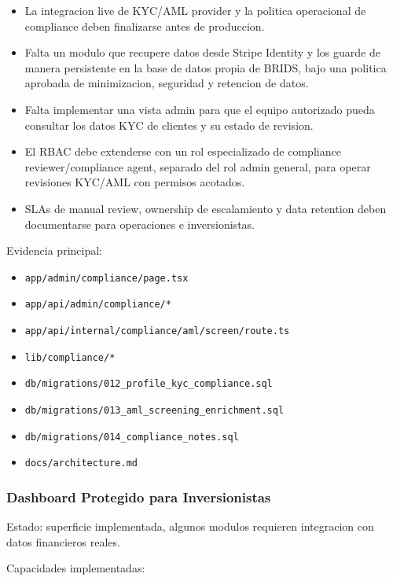 \documentclass[
  10pt,
  letterpaper,
]{article}
\providecommand{\tightlist}{%
  \setlength{\itemsep}{0pt}\setlength{\parskip}{0pt}}
\let\oldtexttt\texttt
\renewcommand{\texttt}[1]{\oldtexttt{\small #1}}
\begin{document}
\begin{itemize}
\tightlist
\item
  La integracion live de KYC/AML provider y la politica operacional de
  compliance deben finalizarse antes de produccion.
\item
  Falta un modulo que recupere datos desde Stripe Identity y los guarde
  de manera persistente en la base de datos propia de BRIDS, bajo una
  politica aprobada de minimizacion, seguridad y retencion de datos.
\item
  Falta implementar una vista admin para que el equipo autorizado pueda
  consultar los datos KYC de clientes y su estado de revision.
\item
  El RBAC debe extenderse con un rol especializado de compliance
  reviewer/compliance agent, separado del rol admin general, para operar
  revisiones KYC/AML con permisos acotados.
\item
  SLAs de manual review, ownership de escalamiento y data retention
  deben documentarse para operaciones e inversionistas.
\end{itemize}

Evidencia principal:

\begin{itemize}
\tightlist
\item
  \texttt{app/admin/compliance/page.tsx}
\item
  \texttt{app/api/admin/compliance/*}
\item
  \texttt{app/api/internal/compliance/aml/screen/route.ts}
\item
  \texttt{lib/compliance/*}
\item
  \texttt{db/migrations/012\_profile\_kyc\_compliance.sql}
\item
  \texttt{db/migrations/013\_aml\_screening\_enrichment.sql}
\item
  \texttt{db/migrations/014\_compliance\_notes.sql}
\item
  \texttt{docs/architecture.md}
\end{itemize}

\subsubsection{Dashboard Protegido para
Inversionistas}\label{dashboard-protegido-para-inversionistas}

Estado: superficie implementada, algunos modulos requieren integracion
con datos financieros reales.

Capacidades implementadas:
\end{document}
